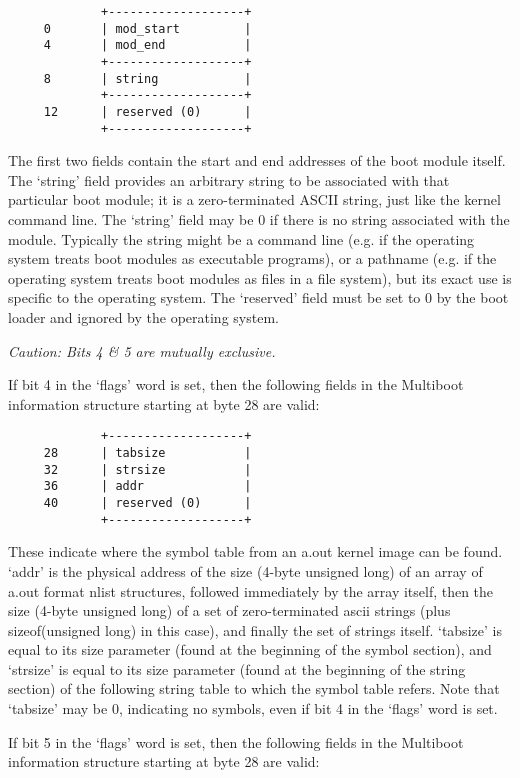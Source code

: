 \begin{verbatim}
             +-------------------+
     0       | mod_start         |
     4       | mod_end           |
             +-------------------+
     8       | string            |
             +-------------------+
     12      | reserved (0)      |
             +-------------------+
\end{verbatim}

The first two fields contain the start and end addresses of the boot module
itself. The ‘string’ field provides an arbitrary string to be associated with
that particular boot module; it is a zero-terminated ASCII string, just like the
kernel command line. The ‘string’ field may be 0 if there is no string
associated with the module. Typically the string might be a command line (e.g.
if the operating system treats boot modules as executable programs), or a
pathname (e.g. if the operating system treats boot modules as files in a file
system), but its exact use is specific to the operating system. The ‘reserved’
field must be set to 0 by the boot loader and ignored by the operating system.

\emph{Caution: Bits 4 \& 5 are mutually exclusive.}

If bit 4 in the ‘flags’ word is set, then the following fields in the Multiboot
information structure starting at byte 28 are valid:

\begin{verbatim}
             +-------------------+
     28      | tabsize           |
     32      | strsize           |
     36      | addr              |
     40      | reserved (0)      |
             +-------------------+
\end{verbatim}

These indicate where the symbol table from an a.out kernel image can be found.
‘addr’ is the physical address of the size (4-byte unsigned long) of an array of
a.out format nlist structures, followed immediately by the array itself, then
the size (4-byte unsigned long) of a set of zero-terminated ascii strings (plus
sizeof(unsigned long) in this case), and finally the set of strings itself.
‘tabsize’ is equal to its size parameter (found at the beginning of the symbol
section), and ‘strsize’ is equal to its size parameter (found at the beginning
of the string section) of the following string table to which the symbol table
refers. Note that ‘tabsize’ may be 0, indicating no symbols, even if bit 4 in
the ‘flags’ word is set.

If bit 5 in the ‘flags’ word is set, then the following fields in the Multiboot
information structure starting at byte 28 are valid:


